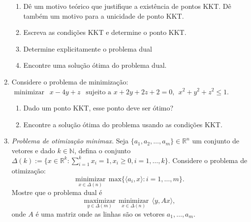 \documentclass[a4paper,latin]{article}
\begin{document}
\begin{enumerate}
\begin{enumerate}
    	\item Dê um motivo teórico que justifique a existência de pontos KKT. Dê também um motivo para a unicidade de ponto KKT.
    	\item Escreva as condições KKT e determine o ponto KKT.
    	\item Determine explicitamente o problema dual
    	\item Encontre uma solução ótima do problema dual. 
    \end{enumerate} 
    \item Considere o problema de minimização:  
    $ \text{ minimizar } \ \ x-4y+z \ \ \text{ sujeito a  } x+2y+2z+2=0, \ \ x^2+y^2+z^2 \leq 1 $. 
       \begin{enumerate}
       	\item Dado um ponto KKT, esse ponto deve ser ótimo?
       	\item Encontre a solução ótima do problema usando as condições KKT. 
       \end{enumerate} 
    \item {\it Problema de otimização minimax}. Seja $\{a_{1}, a_{2}, \dots, a_{m}\} \in \mathbb{R}^{n}$
    um conjunto de vetores e dado $k \in \mathbb{N}$, defina o conjunto 
    $\Delta(k):=\{x \in\mathbb{R}^k: \sum_{i=1}^{k} x_i=1, 
    x_i \geq 0, i=1,\dots,k \}$. 
    Considere o problema de otimização: 
    $$
    \underset{x \in \Delta(n)}{\text{minimizar}} \ \ 
    \text{max}\{ \langle a_{i}, x\rangle : i=1, \dots, m \}. $$
    Mostre que o problema dual é 
    $$
    \underset{y \in \Delta(m)}{\text{maximizar}} \ \
    \underset{x \in \Delta(n)}{\text{minimizar}} \ \ 
    \langle y, Ax \rangle ,$$
    onde $A$ é uma matriz onde as linhas são os vetores $a_{1}, \dots, a_{m}$.
    

\end{enumerate}
\end{document}
